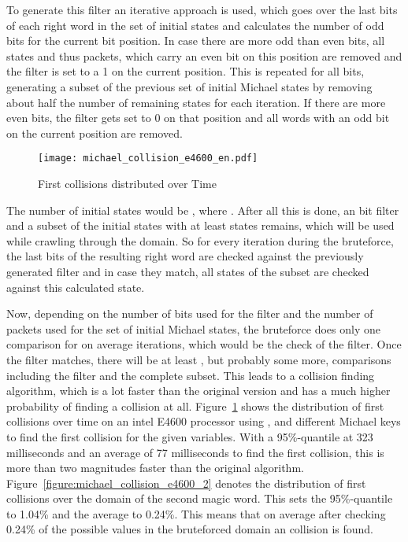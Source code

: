 \documentclass[a4paper,10pt]{scrartcl}
\begin{document}
To generate this filter an iterative approach is used, which goes over the last  bits of each right word in the set of initial states
and calculates the number of odd bits for the current bit position. In case there are more odd than even bits, all states and thus packets,
which carry an even bit on this position are removed and the filter is set to a 1 on the current position. This is repeated for all 
bits, generating a subset of the previous set of initial Michael states by removing about half the number of remaining states for each
iteration. If there are more even bits, the filter gets set to 0 on that position and all words with an odd bit on the current position
are removed.

\begin{figure}[htbp]
  \centering
    \texttt{[image: michael\_collision\_e4600\_en.pdf]}
  \caption{First collisions distributed over Time}
  \label{figure:michael_collision_e4600}
\end{figure}

The number of initial states would be , where . After all this is done, an  bit filter and a subset of the initial states with at
least  states remains, which will be used while crawling through the domain. So for every iteration during the bruteforce,
the last  bits of the resulting right word are checked against the previously generated filter and in case they match, all states of the
subset are checked against this calculated state.

Now, depending on the number of bits used for the filter and the number of packets used for the set of initial Michael states, the
bruteforce does only one comparison for on average  iterations, which would be the check of the filter. Once the filter matches,
there will be at least , but probably some more, comparisons including the filter and the complete subset. This leads to a
collision finding algorithm, which is a lot faster than the original version and has a much higher probability of finding a collision at
all. Figure~\ref{figure:michael_collision_e4600} shows the distribution of first collisions over time on an intel E4600 processor using ,
 and  different Michael keys to find the first collision for the given variables. With a 95\%-quantile at 323 milliseconds and
an average of 77 milliseconds to find the first collision, this is more than two magnitudes faster than the original algorithm.
Figure~\ref{figure:michael_collision_e4600_2} denotes the distribution of first collisions over the domain of the second magic word. This
sets the 95\%-quantile to 1.04\% and the average to 0.24\%. This means that on average after checking 0.24\% of the  possible values
in the bruteforced domain an collision is found.
\end{document}
